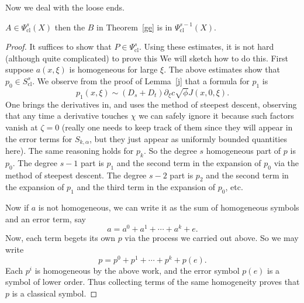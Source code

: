 \documentclass[12pt]{article}
\begin{document}
Now we deal with the loose ends.
\begin{prop} $A \in \Psi_{\text{cl}}^s(X)$ then the $B$ in Theorem~\ref{ge} is in $\Psi^{s-1}_{\text{cl}}(X)$.\end{prop}
\begin{proof}It suffices to show that $P \in \Psi_{\text{cl}}^s$. Using these estimates, it is not hard (although quite complicated) to prove this We will sketch how to do this. First suppose $a(x,\xi)$ is homogeneous for large $\xi$. The above estimates show that $p_0 \in S^s_{\text{cl}}$. We observe from the proof of Lemma~\ref{j} that a formula for $p_1$ is
\[p_1(x,\xi) \sim (D_s+D_t)\partial_{\xi}c\sqrt{\phi}J(x,0,\xi).\] One brings the derivatives in, and uses the method of steepest descent, observing that any time a derivative touches $\chi$ we can safely ignore it because such factors vanish at $\zeta=0$ (really one needs to keep track of them since they will appear in the error terms for $S_{k,\alpha}$, but they just appear as uniformly bounded quantities here). The same reasoning holds for $p_k$. So the degree $s$ homogeneous part of $p$ is $p_0$. The degree $s-1$ part is $p_1$ and the second term in the expansion of $p_0$ via the method of steepest descent. The degree $s-2$ part is $p_2$ and the second term in the expansion of $p_1$ and the third term in the expansion of $p_0$, etc.

Now if $a$ is not homogeneous, we can write it as the sum of homogeneous symbols and an error term, say
\[a = a^0+a^1+\cdots + a^k + e.\]
Now, each term begets its own $p$ via the process we carried out above. So we may write
\[p = p^0+p^1 + \cdots + p^k + p(e).\] Each $p^i$ is homogeneous by the above work, and the error symbol $p(e)$ is a symbol of lower order. Thus collecting terms of the same homogeneity proves that $p$ is a classical symbol.
\end{proof}
\end{document}
